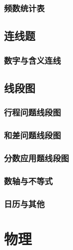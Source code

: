 \section{频数统计表}


\chapter{连线题}

\section{数字与含义连线}


\chapter{线段图}

\section{行程问题线段图}


\section{和差问题线段图}


\section{分数应用题线段图}


\section{数轴与不等式}


\section{日历与其他}


\part{物理}

